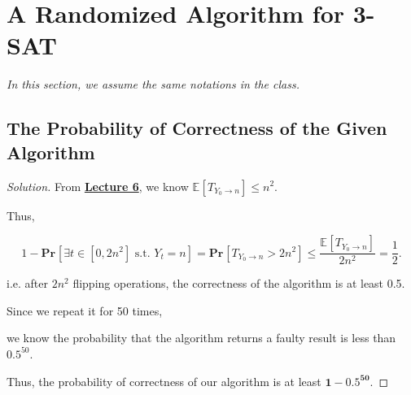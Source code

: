 \documentclass{article}
\renewcommand{\Pr}[2]{\mathbf{Pr}_{#1}\left[#2\right]}
\newcommand{\staExp}[2]{\mathbb{E}_{#1}\left[#2\right]}
\newenvironment{solution}{\begin{proof}[\noindent\it Solution]}{\end{proof}}
\begin{document}
\newpage
\vspace{1em}
\section{A Randomized Algorithm for 3-SAT}
\vspace{1em}

\textit{In this section, we assume the same notations in the class.}

\vspace{3.9em}
\subsection{The Probability of Correctness of the Given Algorithm}
\vspace{1em}
\begin{solution}
From \underline{\textbf{Lecture 6}}, we know $\staExp{}{T_{Y_0\rightarrow n}}\le n^2$.

\hspace{2.6em}
Thus,

\vspace{-1.5em}
$$1-\Pr{}{\exists t\in[0,2n^2]\text{ s.t. } Y_t=n} = \Pr{}{T_{Y_0\rightarrow n}>2n^2} \le\frac{\staExp{}{T_{Y_0\rightarrow n}}}{2n^2}=\frac{1}{2}. $$

\vspace{-0.5em} \hspace{2.6em}
i.e. after $2n^2$ flipping operations, the correctness of the algorithm is at least 0.5.

\hspace{2.6em}
Since we repeat it for 50 times, 

\hspace{6em}
we know the probability that the algorithm returns a faulty result is less than $0.5^{50}$.

\vspace{2em} \hspace{2.6em}
Thus, the probability of correctness of our algorithm is at least \underline{$\boldsymbol{1-0.5^{50}}$}.
\end{solution}

\vspace{3em}
\end{document}
